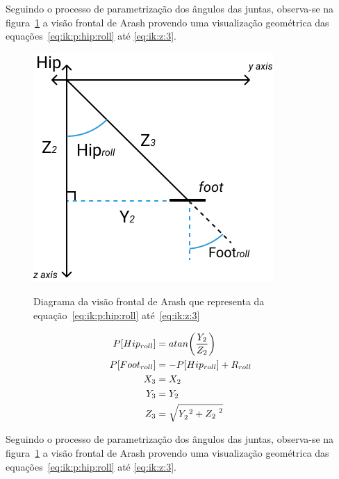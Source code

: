 Seguindo o processo de parametrização dos ângulos das juntas, observa-se na figura~\ref{fig:ik:frontalview} a visão frontal de Arash provendo uma visualização geométrica das equações~\ref{eq:ik:p:hip:roll} até \ref{eq:ik:z:3}.

\begin{figure}[htb]
	\centering
	\includegraphics[scale=1.5]{imagens/svg/inverse-kinematics-frontalview}
	\caption{Diagrama da visão frontal de Arash que representa da equação~\ref{eq:ik:p:hip:roll} até~\ref{eq:ik:z:3}}
	\caption*{\cite{karimionline}}
	\label{fig:ik:frontalview}
\end{figure}

\begin{align}
	 P[Hip_{roll}] &= atan\bigg(\dfrac{Y_2}{Z_2}\bigg)                    \label{eq:ik:p:hip:roll}     \\
	P[Foot_{roll}] &= -P[Hip_{roll}] + R_{roll}                            \label{eq:ik:p:foot:roll}    \\
			   X_3 &= X_2                                                   \label{eq:ik:x:3}            \\
			   Y_3 &= Y_2                                                    \label{eq:ik:y:3}            \\
	           Z_3 &= \sqrt{Y_2^{\hspace{1mm}2} + {Z_2}^{\hspace{1mm}2}}      \label{eq:ik:z:3}
\end{align}

Seguindo o processo de parametrização dos ângulos das juntas, observa-se na figura~\ref{fig:ik:frontalview} a visão frontal de Arash provendo uma visualização geométrica das equações~\ref{eq:ik:p:hip:roll} até \ref{eq:ik:z:3}.

